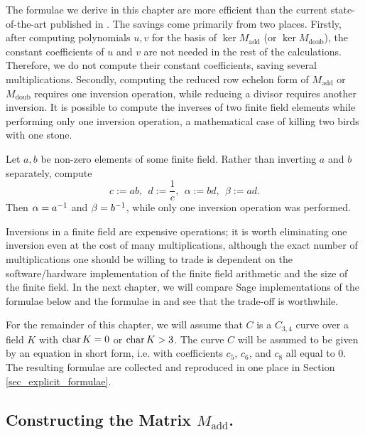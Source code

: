 The formulae we derive in this chapter are more efficient than the current state-of-the-art published in \cite{kmakdisi18}.
The savings come primarily from two places.
Firstly, after computing polynomials $u,v$ for the basis of $\ker M_{\text{add}}$ (or $\ker M_{\text{doub}}$),
the constant coefficients of $u$ and $v$ are not needed in the rest of the calculations.
Therefore, we do not compute their constant coefficients, saving several multiplications.
Secondly, computing the reduced row echelon form of $M_{\text{add}}$ or $M_{\text{doub}}$ requires one inversion
operation, while reducing a divisor requires another inversion.
It is possible to compute the inverses of two finite field elements while performing only one inversion operation,
a mathematical case of killing two birds with one stone.
\begin{example}
  \label{ex_two_birds_one_stone}
  Let $a, b$ be non-zero elements of some finite field.
  Rather than inverting $a$ and $b$ separately, compute
  \[ c := ab, ~~ d := \frac 1 c, ~~ \alpha := bd, ~~ \beta := ad. \]
  Then $\alpha = a^{-1}$ and $\beta = b^{-1}$, while only one inversion operation was performed.
\end{example}
Inversions in a finite field are expensive operations;
it is worth eliminating one inversion even at the cost of many multiplications,
although the exact number of multiplications one should be willing to trade is dependent on
the software/hardware implementation of the finite field arithmetic and the size of the finite field.
In the next chapter, we will compare Sage implementations of the formulae below and the formulae in \cite{kmakdisi18}
and see that the trade-off is worthwhile.

For the remainder of this chapter, we will assume that $C$ is a $C_{3,4}$ curve
over a field $K$ with $\operatorname{char} K = 0$ or $\operatorname{char} K > 3$.
The curve $C$ will be assumed to be given by an equation in short form,
i.e. with coefficients $c_5$, $c_6$, and $c_8$ all equal to 0.
The resulting formulae are collected and reproduced in one place in Section \ref{sec_explicit_formulae}.




\subsection{Constructing the Matrix $M_{\text{add}}$.}

